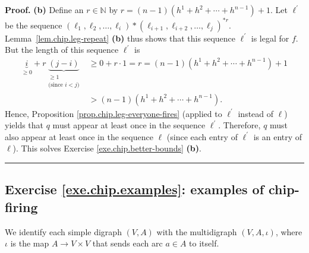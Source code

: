 \documentclass[numbers=enddot,12pt,final,onecolumn,notitlepage]{scrartcl}%
\theoremstyle{definition}
\newenvironment{proof}[1][Proof]{\noindent\textbf{#1.} }{\ \rule{0.5em}{0.5em}}
\newcommand{\NN}{\mathbb{N}}
\newcommand{\tup}[1]{\left( #1 \right)}
\begin{document}
\begin{proof}
\textbf{(b)} Define an $r \in \NN$ by
$r = \tup{n - 1} \tup{ h^1 + h^2 + \cdots + h^{n-1} } + 1$.
Let $\ell^{\prime}$ be the sequence
$\left(  \ell_{1}%
,\ell_{2},\ldots,\ell_{i}\right)  \ast\left(  \ell_{i+1},\ell_{i+2}%
,\ldots,\ell_{j}\right)  ^{\ast r}$.
Lemma~\ref{lem.chip.leg-repeat} \textbf{(b)} thus shows that
this sequence $\ell^\prime$ is legal for $f$.
But the length of this sequence $\ell^{\prime}$ is
\begin{align*}
\underbrace{i}_{\geq0}+r\underbrace{\left(  j-i\right)  }_{\substack{\geq
1\\\text{(since }i<j\text{)}}}  &  \geq0+r\cdot1=r=\left(  n-1\right)  \left(
h^1 + h^2 + \cdots + h^{n-1} \right)  +1\\
&  >\left(  n-1\right)  \left(  h^1 + h^2 + \cdots + h^{n-1} \right)  .
\end{align*}
Hence, Proposition \ref{prop.chip.leg-everyone-fires} (applied to
$\ell^{\prime}$ instead of $\ell$) yields that $q$ must appear at least once
in the sequence $\ell^{\prime}$. Therefore, $q$ must also appear at least once
in the sequence $\ell$ (since each entry of $\ell^{\prime}$ is an entry of
$\ell$). This solves Exercise \ref{exe.chip.better-bounds} \textbf{(b)}.
\end{proof}

\subsection{Exercise \ref{exe.chip.examples}: examples of chip-firing}

We identify each simple digraph $\tup{V, A}$ with the multidigraph
$\tup{V, A, \iota}$, where $\iota$ is the map $A \to V \times V$ that
sends each arc $a \in A$ to itself.
\end{document}
